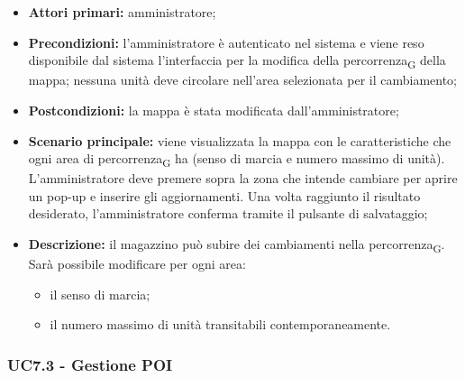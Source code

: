 \begin{itemize}

  \item   \textbf{Attori primari:} amministratore;

  \item   \textbf{Precondizioni:}  l'amministratore è autenticato nel sistema e viene reso disponibile dal sistema l'interfaccia per la modifica della percorrenza\textsubscript{G} della mappa; nessuna unità deve circolare nell'area selezionata per il cambiamento;

  \item   \textbf{Postcondizioni:} la mappa è stata modificata dall'amministratore;
 \item   \textbf{Scenario principale:} viene visualizzata la mappa con le caratteristiche che ogni area di percorrenza\textsubscript{G} ha (senso di marcia e numero massimo di unità). L'amministratore deve premere sopra la zona che intende cambiare per aprire un pop-up e inserire gli aggiornamenti. Una volta raggiunto il risultato desiderato, l'amministratore conferma tramite il pulsante di salvataggio;

  \item   \textbf{Descrizione:} il magazzino può subire dei cambiamenti nella percorrenza\textsubscript{G}. Sarà possibile modificare per ogni area:

  \begin{itemize}

     \item il senso di marcia;

   \item il numero massimo di unità transitabili contemporaneamente.

 \end{itemize}

\end{itemize}



\subsubsection{UC7.3 - Gestione POI}



